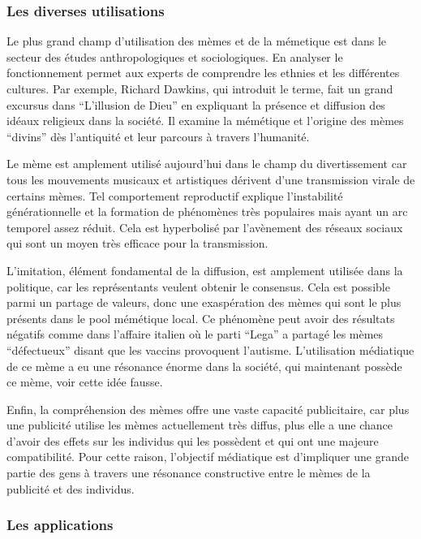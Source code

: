 \documentclass[12pt]{article}
\begin{document}
\subsubsection{Les diverses utilisations}

Le plus grand champ d'utilisation des mèmes et de la mémetique est dans
le secteur des études anthropologiques et sociologiques. En analyser le
fonctionnement permet aux experts de comprendre les ethnies et les
différentes cultures. Par exemple, Richard Dawkins, qui introduit le
terme, fait un grand excursus dans ``L'illusion de Dieu'' en expliquant
la présence et diffusion des idéaux religieux dans la société. Il
examine la mémétique et l'origine des mèmes ``divins'' dès l'antiquité
et leur parcours à travers l'humanité.

Le mème est amplement utilisé aujourd'hui dans le champ du
divertissement car tous les mouvements musicaux et artistiques dérivent
d'une transmission virale de certains mèmes. Tel comportement
reproductif explique l'instabilité générationnelle et la formation de
phénomènes très populaires mais ayant un arc temporel assez réduit. Cela
est hyperbolisé par l'avènement des réseaux sociaux qui sont un moyen
très efficace pour la transmission.

L'imitation, élément fondamental de la diffusion, est amplement utilisée
dans la politique, car les représentants veulent obtenir le consensus.
Cela est possible parmi un partage de valeurs, donc une exaspération des
mèmes qui sont le plus présents dans le pool mémétique local. Ce
phénomène peut avoir des résultats négatifs comme dans l'affaire italien
où le parti ``Lega'' a partagé les mèmes ``défectueux'' disant que les
vaccins provoquent l'autisme. L'utilisation médiatique de ce mème a eu
une résonance énorme dans la société, qui maintenant possède ce mème,
voir cette idée fausse. \cite{imitation}

Enfin, la compréhension des mèmes offre une vaste capacité publicitaire,
car plus une publicité utilise les mèmes actuellement très diffus, plus
elle a une chance d'avoir des effets sur les individus qui les possèdent
et qui ont une majeure compatibilité. Pour cette raison, l'objectif
médiatique est d'impliquer une grande partie des gens à travers une
résonance constructive entre le mèmes de la publicité et des individus.

\subsubsection{Les applications}
\end{document}
